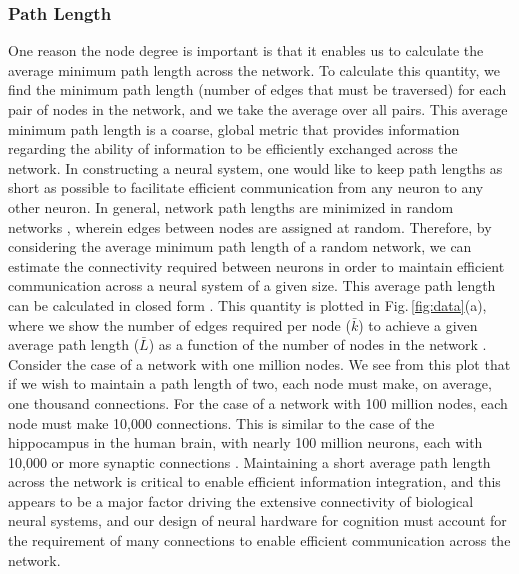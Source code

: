 \documentclass[twocolumn]{article}
\begin{document}
\subsubsection{Path Length}
One reason the node degree is important is that it enables us to calculate the average minimum path length across the network. To calculate this quantity, we find the minimum path length (number of edges that must be traversed) for each pair of nodes in the network, and we take the average over all pairs. This average minimum path length is a coarse, global metric that provides information regarding the ability of information to be efficiently exchanged across the network. In constructing a neural system, one would like to keep path lengths as short as possible to facilitate efficient communication from any neuron to any other neuron. In general, network path lengths are minimized in random networks \cite{baal1999}, wherein edges between nodes are assigned at random. Therefore, by considering the average minimum path length of a random network, we can estimate the connectivity required between neurons in order to maintain efficient communication across a neural system of a given size. This average path length can be calculated in closed form \cite{frfr2004}. This quantity is plotted in Fig.\,\ref{fig:data}(a), where we show the number of edges required per node ($\bar{k}$) to achieve a given average path length ($\bar{L}$) as a function of the number of nodes in the network \cite{frfr2004}. Consider the case of a network with one million nodes. We see from this plot that if we wish to maintain a path length of two, each node must make, on average, one thousand connections. For the case of a network with 100 million nodes, each node must make 10,000 connections. This is similar to the case of the hippocampus in the human brain, with nearly 100 million neurons, each with 10,000 or more synaptic connections \cite{bu2006}. Maintaining a short average path length across the network is critical to enable efficient information integration, and this appears to be a major factor driving the extensive connectivity of biological neural systems, and our design of neural hardware for cognition must account for the requirement of many connections to enable efficient communication across the network.  
\end{document}
